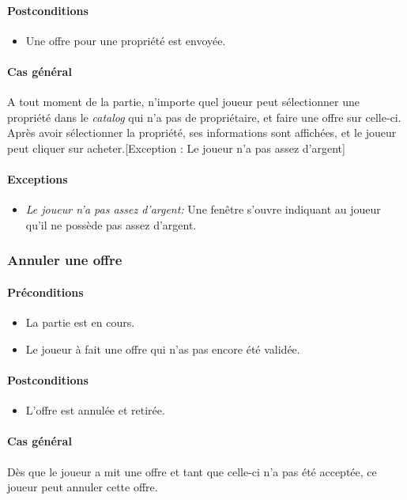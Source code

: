 \documentclass[a4paper,11pt]{report}
\begin{document}
\paragraph{Postconditions}
\begin{itemize}
 \item Une offre pour une propriété est envoyée.
\end{itemize}
\paragraph{Cas général}
A tout moment de la partie, n'importe quel joueur peut sélectionner une propriété dans le \textit{catalog} qui n'a pas de propriétaire, et faire une offre sur celle-ci. Après avoir sélectionner la propriété, ses informations sont affichées, et le joueur peut cliquer sur acheter.[Exception : Le joueur n'a pas assez d'argent]
\paragraph{Exceptions}
\begin{itemize}
 \item \textit{Le joueur n'a pas assez d'argent:} Une fenêtre s'ouvre indiquant au joueur qu'il ne possède pas assez d'argent.
\end{itemize}

\subsubsection{Annuler une offre}
\paragraph{Préconditions}
\begin{itemize}
 \item La partie est en cours.
 \item Le joueur à fait une offre qui n'as pas encore été validée.
\end{itemize}
\paragraph{Postconditions}
\begin{itemize}
 \item L'offre est annulée et retirée.
\end{itemize}
\paragraph{Cas général}
Dès que le joueur a mit une offre et tant que celle-ci n'a pas été acceptée, ce joueur peut annuler cette offre.
\end{document}
